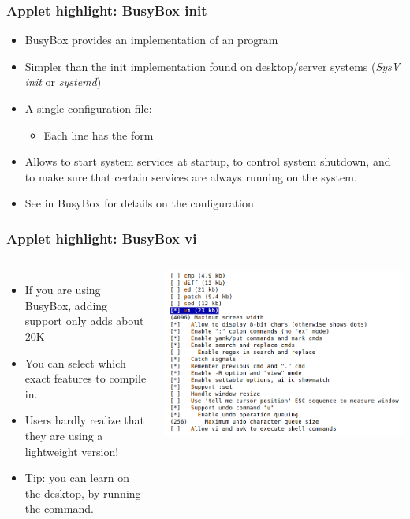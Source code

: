 \begin{frame}
  \frametitle{Applet highlight: BusyBox init}
  \begin{itemize}
  \item BusyBox provides an implementation of an  program
  \item Simpler than the init implementation found on desktop/server
    systems ({\em SysV init} or {\em systemd})
  \item A single configuration file: 
    \begin{itemize}
    \item Each line has the form 
    \end{itemize}
  \item Allows to start system services at startup, to control system
        shutdown, and to make sure that certain services are always
        running on the system.
  \item See  in BusyBox for details on the
    configuration
  \end{itemize}
\end{frame}

\begin{frame}
  \frametitle{Applet highlight: BusyBox vi}
  \begin{columns}
      \begin{itemize}
      \item If you are using BusyBox, adding  support only adds
        about 20K
      \item You can select which exact features to compile in.
      \item Users hardly realize that they are using a lightweight 
        version!
      \item Tip: you can learn  on the desktop, by running the 
        command.
      \end{itemize}
      \includegraphics[width=\textwidth]{slides/linux-busybox/busybox-vi-configuration.png}
  \end{columns}
\end{frame}
